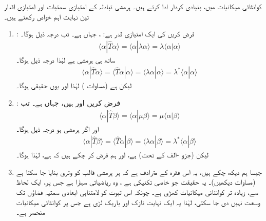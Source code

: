 کوانٹائی میکانیات میں،  
    بنیادی کردار ادا کرتے ہیں۔ ہرمشی تبادلہ کے امتیازی سمتیات اور امتیازی اقدار تین نہایت اہم خواص رکھتے ہیں۔
\begin{enumerate}[a]
\item
{}

: فرض کریں  کی ایک امتیازی قدر  ہے:   ، جہاں  ہے۔ تب درجہ ذیل ہوگا۔
\begin{align*}
	\langle\alpha|\hat{T}\alpha\rangle = \langle\alpha|\lambda\alpha\rangle = \lambda\langle\alpha|\alpha\rangle
\end{align*}
ساتھ ہی  ہرمشی ہے لہٰذا درجہ ذیل ہوگا۔
\begin{align*}
	\langle\alpha|\hat{T}\alpha\rangle = \langle\hat{T}\alpha|\alpha\rangle = \langle\lambda\alpha|\alpha\rangle = \lambda^*\langle\alpha|\alpha\rangle
\end{align*}
لیکن  ہے  (مساوات )  لہٰذا  اور یوں  حقیقی ہوگا۔
\item
{}

: فرض کریں  اور  ہیں،  جہاں  ہے۔ تب
\begin{align*}
	\langle\alpha|\hat{T}\beta\rangle = \langle\alpha|\mu\beta\rangle = \mu\langle\alpha|\beta\rangle
\end{align*}
اور اگر  ہرمشی ہو درجہ ذیل ہوگا۔
\begin{align*}
	\langle\alpha|\hat{T}\beta\rangle = \langle\hat{T}\alpha|\beta\rangle = \langle\lambda\alpha|\beta\rangle = \lambda^*\langle\alpha|\beta\rangle
\end{align*}
لیکن   (جزو -الف کے تحت)   ہے،   اور ہم فرض کر چکے ہیں کہ  ہے،  لہٰذا  ہوگا۔
\item
{}

 جیسا ہم دیکھ چکے ہیں،  یہ اس فقرہ  کے مترادف ہے کہ ہر  ہرمشی قالب کو وتری بنایا جا سکتا ہے (مساوات   دیکھیں)۔ یہ    حقیقت جو خاصی تکنیکی ہے ،   وہ ریاضیاتی سہارا ہے جس پر، ایک لحاظ سے،  زیادہ تر کوانٹائی میکانیات کھڑی ہے۔ چونکہ اس ثبوت کو لامتناہی ابعادی سمتیہ فضاؤں تک وسعت نہیں دی جا سکتی،  لہٰذا یہ ایک نہایت نازک اور  باریک لڑی ہے جس پر کوانٹائی میکانیات منحصر ہے۔
\end{enumerate}
